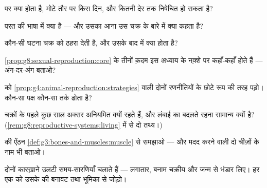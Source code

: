 \begin{exercise}[$\star$]\label{exo:g8:reproductive-systems:4}
 पर क्या होता है, मोटे तौर पर किस दिन, और  कितनी देर
तक निषेचित हो सकता है?
\end{exercise}

\begin{exercise}[$\star$]\label{exo:g8:reproductive-systems:5}
परत की भाषा में  क्या है --- और उसका आना उस चक्र के बारे में
क्या कहता है?
\end{exercise}

\begin{exercise}[$\star$]\label{exo:g8:reproductive-systems:6}
कौन-सी घटना चक्र को ठहरा देती है, और उसके बाद  में क्या होता है?
\end{exercise}

\begin{exercise}[$\star\star$]\label{exo:g8:reproductive-systems:7}
\cref{prop:g8:sexual-reproduction:core} के तीनों क़दम इस अध्याय के
नक़्शे पर कहाँ-कहाँ होते हैं --- अंग-दर-अंग बताओ?
\end{exercise}

\begin{exercise}[$\star\star$]\label{exo:g8:reproductive-systems:8}
 को \cref{prop:g4:animal-reproduction:strategies} वाली दोनों
रणनीतियों के छोटे रूप की तरह पढ़ो। कौन-सा पक्ष कौन-सा तर्क ढोता है?
\end{exercise}

\begin{exercise}[$\star\star$]\label{exo:g8:reproductive-systems:9}
चक्रों के पहले कुछ साल अक्सर अनियमित क्यों रहते हैं, और लंबाई का बदलते
रहना सामान्य क्यों है? (\cref{rem:g8:reproductive-systems:living} में
से दो तथ्य।)
\end{exercise}

\begin{exercise}[$\star\star$]\label{exo:g8:reproductive-systems:10}
 की ऐंठन \cref{def:g3:bones-and-muscles:muscle} से समझाओ ---
और मदद करने वाली दो चीज़ों के नाम भी बताओ।
\end{exercise}

\begin{exercise}[$\star\star$]\label{exo:g8:reproductive-systems:11}
दोनों कारख़ाने उलटी समय-सारणियाँ चलाते हैं --- लगातार, बनाम चक्रीय और
जन्म से भंडार लिए। हर एक को उसके  की बनावट तथा भूमिका से जोड़ो।
\end{exercise}

